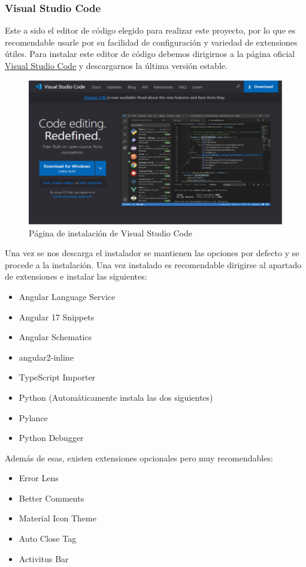 \subsubsection{Visual Studio Code}
Este a sido el editor de código elegido para realizar este proyecto, por lo que es recomendable usarle por su facilidad de configuración y variedad de extensiones útiles.
Para instalar este editor de código debemos dirigirnos a la página oficial
\href{https://code.visualstudio.com/}{Visual Studio Code} y descargarnos la última versión estable.
\begin{figure}[h]
    \centering
    \includegraphics[width=0.75\linewidth]{Imagenes/VisualInstalacion.png}
    \caption{Página de instalación de Visual Studio Code}
    \label{Página de instalación de Visual Studio Code}
\end{figure}
\FloatBarrier


Una vez se nos descarga el instalador se mantienen las opciones por defecto y se procede a la instalación. Una vez instalado es recomendable dirigirse al apartado de extensiones e instalar las siguientes:
\begin{itemize}
    \item Angular Language Service
    \item Angular 17 Snippets
    \item Angular Schematics
    \item angular2-inline
    \item TypeScript Importer
    \item Python (Automáticamente instala las dos siguientes)
    \item Pylance
    \item Python Debugger
\end{itemize}

Además de esas, existen extensiones opcionales pero muy recomendables:
\begin{itemize}
    \item Error Lens
    \item Better Comments
    \item Material Icon Theme
    \item Auto Close Tag
    \item Activitus Bar
\end{itemize}

